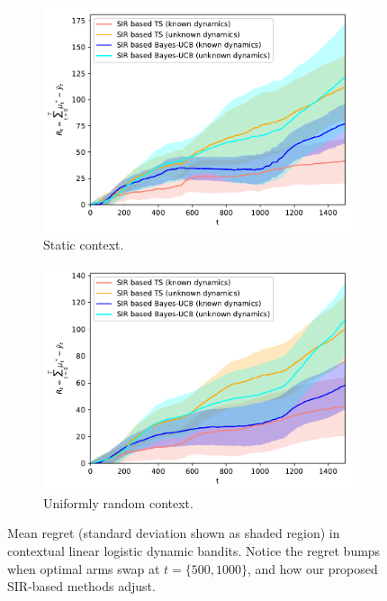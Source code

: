 \documentclass{article}
\begin{document}
\begin{figure}[!h]
	\begin{subfigure}[b]{0.49\textwidth}
		\includegraphics[width=\textwidth]{./figs/dynamic/logistic/cumulative_regret_all_cstatic}
		\caption{Static context.}
		\label{fig:dynamic_bandits_logistic_cstatic}
	\end{subfigure}
	\begin{subfigure}[b]{0.49\textwidth}
		\includegraphics[width=\textwidth]{./figs/dynamic/logistic/cumulative_regret_all_crand}
		\caption{Uniformly random context.}
		\label{fig:dynamic_bandits_logistic_crand}
	\end{subfigure}
	\caption{Mean regret (standard deviation shown as shaded region) in contextual linear logistic dynamic bandits. Notice the regret bumps when optimal arms swap at $t=\{500, 1000\}$, and how our proposed SIR-based methods adjust.}
	\label{fig:dynamic_bandits_logistic}
\end{figure}
\end{document}
